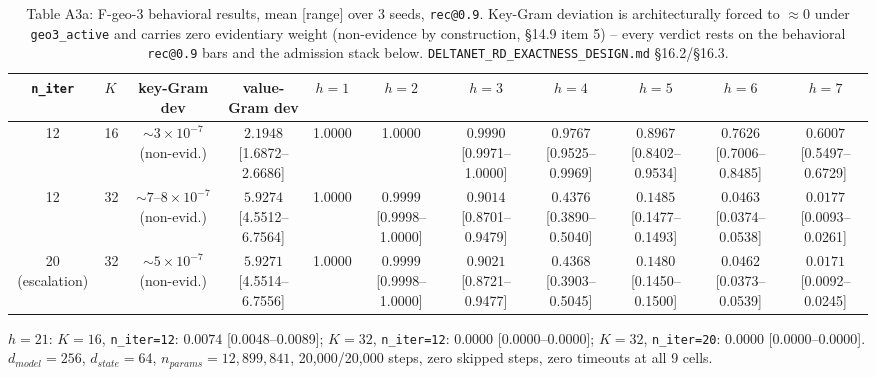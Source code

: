 \begin{table}[htbp]
\centering
\scriptsize
\begin{tabular}{clccccccccc}
\toprule
\texttt{n\_iter} & $K$ & key-Gram dev & value-Gram dev & $h{=}1$ & $h{=}2$ & $h{=}3$ & $h{=}4$ & $h{=}5$ & $h{=}6$ & $h{=}7$ \\
\midrule
12 & 16 & $\sim3\times10^{-7}$ (non-evid.) & $2.1948$ [1.6872--2.6686] & 1.0000 & 1.0000 & $0.9990$ [0.9971--1.0000] & $0.9767$ [0.9525--0.9969] & $0.8967$ [0.8402--0.9534] & $0.7626$ [0.7006--0.8485] & $0.6007$ [0.5497--0.6729] \\
12 & 32 & $\sim7$--$8\times10^{-7}$ (non-evid.) & $5.9274$ [4.5512--6.7564] & 1.0000 & $0.9999$ [0.9998--1.0000] & $0.9014$ [0.8701--0.9479] & $0.4376$ [0.3890--0.5040] & $0.1485$ [0.1477--0.1493] & $0.0463$ [0.0374--0.0538] & $0.0177$ [0.0093--0.0261] \\
20 (escalation) & 32 & $\sim5\times10^{-7}$ (non-evid.) & $5.9271$ [4.5514--6.7556] & 1.0000 & $0.9999$ [0.9998--1.0000] & $0.9021$ [0.8721--0.9477] & $0.4368$ [0.3903--0.5045] & $0.1480$ [0.1450--0.1500] & $0.0462$ [0.0373--0.0539] & $0.0171$ [0.0092--0.0245] \\
\bottomrule
\end{tabular}

\vspace{4pt}
{\scriptsize $h{=}21$: $K{=}16$, \texttt{n\_iter=12}: $0.0074$ [0.0048--0.0089]; $K{=}32$, \texttt{n\_iter=12}: $0.0000$ [0.0000--0.0000]; $K{=}32$, \texttt{n\_iter=20}: $0.0000$ [0.0000--0.0000]. $d_{model}{=}256$, $d_{state}{=}64$, $n_{params}{=}12{,}899{,}841$, 20{,}000/20{,}000 steps, zero skipped steps, zero timeouts at all 9 cells.}

\caption{Table A3a: F-geo-3 behavioral results, mean [range] over 3
seeds, \texttt{rec@0.9}. Key-Gram deviation is architecturally forced to
$\approx 0$ under \texttt{geo3\_active} and carries zero evidentiary
weight (non-evidence by construction, \S14.9 item 5) -- every verdict
rests on the behavioral \texttt{rec@0.9} bars and the admission stack
below. \texttt{DELTANET\_RD\_EXACTNESS\_DESIGN.md} \S16.2/\S16.3.}
\end{table}

